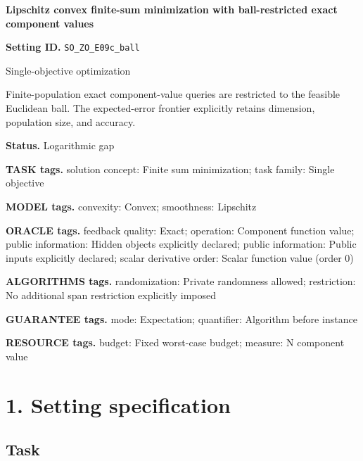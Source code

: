 \documentclass[10pt,a4paper]{article}
\begin{document}
\raggedright

{\LARGE\bfseries\sffamily\color{AtlasNavy} Lipschitz convex finite-sum minimization with ball-restricted exact component values\par}\vspace{5pt}


\textbf{Setting ID.} \texttt{SO\_\allowbreak{}ZO\_\allowbreak{}E09c\_\allowbreak{}ball}



Single-objective optimization



Finite-population exact component-value queries are restricted to the feasible Euclidean ball. The expected-error frontier explicitly retains dimension, population size, and accuracy.



\textbf{Status.} Logarithmic gap



\textbf{TASK tags.} solution concept: Finite sum minimization; task family: Single objective



\textbf{MODEL tags.} convexity: Convex; smoothness: Lipschitz



\textbf{ORACLE tags.} feedback quality: Exact; operation: Component function value; public information: Hidden objects explicitly declared; public information: Public inputs explicitly declared; scalar derivative order: Scalar function value (order 0)



\textbf{ALGORITHMS tags.} randomization: Private randomness allowed; restriction: No additional span restriction explicitly imposed



\textbf{GUARANTEE tags.} mode: Expectation; quantifier: Algorithm before instance



\textbf{RESOURCE tags.} budget: Fixed worst-case budget; measure: N component value



\section{1. Setting specification}


\subsection{Task}
\end{document}
